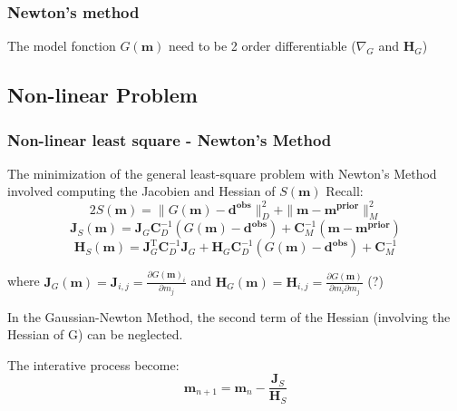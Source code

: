 \documentclass[twocolumn]{article}
\numberwithin{equation}{section}
\begin{document}
		\subsubsection{Newton's method}
The model fonction $G(\mathbf{m})$ need to be 2 order differentiable ($\nabla_G$ and $\mathbf{H}_G$)





	\subsection{Non-linear Problem}
\subsubsection{Non-linear least square - Newton's Method}
The minimization of the general least-square problem with Newton's Method involved computing the Jacobien and Hessian of $S(\mathbf{m})$
Recall:
$$2S(\mathbf{m})=\|G(\mathbf{m})-\mathbf{d^{obs}}\|_D^2 + \|\mathbf{m}-\mathbf{m^{prior}}\|_M^2$$
$$\mathbf{J}_S(\mathbf{m})=\mathbf{J}_G\mathbf{C}_D^{-1}(G(\mathbf{m})-\mathbf{d^{obs}}) + \mathbf{C}_M^{-1} (\mathbf{m}-\mathbf{m^{prior}})$$
$$\mathbf{H}_S(\mathbf{m})=\mathbf{J}_G^\mathrm{T}\mathbf{C}_D^{-1}\mathbf{J}_G  + \mathbf{H}_G \mathbf{C}_D^{-1} (G(\mathbf{m})-\mathbf{d^{obs}}) + \mathbf{C}_M^{-1} $$

where $\mathbf{J}_G(\mathbf{m})=\mathbf{J}_{i,j}=\frac{\partial G(\mathbf{m})_i}{\partial m_j}$ and $\mathbf{H}_G(\mathbf{m})=\mathbf{H}_{i,j}=\frac{\partial G(\mathbf{m})}{\partial m_i \partial m_j}$ (?)

In the Gaussian-Newton Method, the second term of the Hessian (involving the Hessian of G) can be neglected.

The interative process become:
$$\mathbf{m}_{n+1} = \mathbf{m}_{n} - \frac{\mathbf{J}_S}{\mathbf{H}_S}$$


	
	
\end{document}
